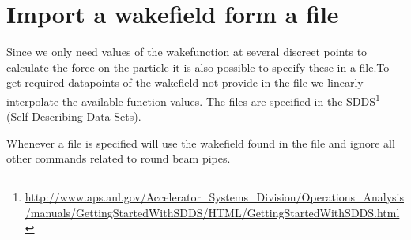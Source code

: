 \section{Import a wakefield form a file}
\label{sec:WFNAME}

Since we only need values of the wakefunction at several discreet points to calculate the force on the particle it is also possible to specify these in a file.To get required datapoints of the wakefield not provide in the file we linearly interpolate the available function values. The files are specified in the SDDS\footnote{\url{http://www.aps.anl.gov/Accelerator_Systems_Division/Operations_Analysis/manuals/GettingStartedWithSDDS/HTML/GettingStartedWithSDDS.html}} (Self Describing Data Sets).

Whenever a file is specified \opal will use the wakefield found in the file and ignore all other commands related to round beam pipes.

